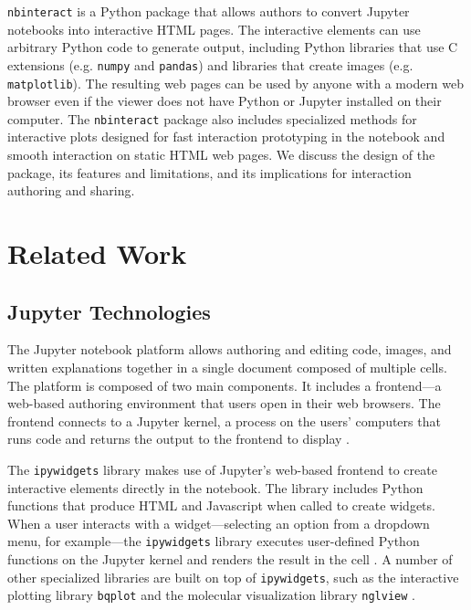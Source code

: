 \documentclass[nobib]{tufte-handout}
\newcommand{\code}[1]{\texttt{#1}}
\begin{document}
\code{nbinteract} is a Python package that allows authors to convert Jupyter
notebooks into interactive HTML pages. The interactive elements can use
arbitrary Python code to generate output, including Python libraries that use C
extensions (e.g. \code{numpy} and \code{pandas}) and libraries that create
images (e.g. \code{matplotlib}). The resulting web pages can be used by anyone
with a modern web browser even if the viewer does not have Python or Jupyter
installed on their computer. The \code{nbinteract} package also includes
specialized methods for interactive plots designed for fast interaction
prototyping in the notebook and smooth interaction on static HTML web pages.
We discuss the design of the package, its features and limitations, and its
implications for interaction authoring and sharing.


\section{Related Work} %
\label{sec:related_work}

\subsection{Jupyter Technologies} %
\label{sub:jupyter_technologies}

The Jupyter notebook platform allows authoring and editing code, images, and
written explanations together in a single document composed of multiple cells.
The platform is composed of two main components. It includes a frontend---a
web-based authoring environment that users open in their web browsers. The
frontend connects to a Jupyter kernel, a process on the users' computers that
runs code and returns the output to the frontend to display
\cite{thomas_jupyter_2016}.

The \code{ipywidgets} library makes use of Jupyter's web-based frontend to
create interactive elements directly in the notebook. The library includes
Python functions that produce HTML and Javascript when called to create
widgets. When a user interacts with a widget---selecting an option from a
dropdown menu, for example---the \code{ipywidgets} library executes
user-defined Python functions on the Jupyter kernel and renders the result in
the cell \cite{_jupyter-widgets/ipywidgets_}. A number of other specialized
libraries are built on top of \code{ipywidgets}, such as the interactive
plotting library \code{bqplot} \cite{_bqplot_2018} and the molecular
visualization library \code{nglview} \cite{_arose/nglview_}.
\end{document}
